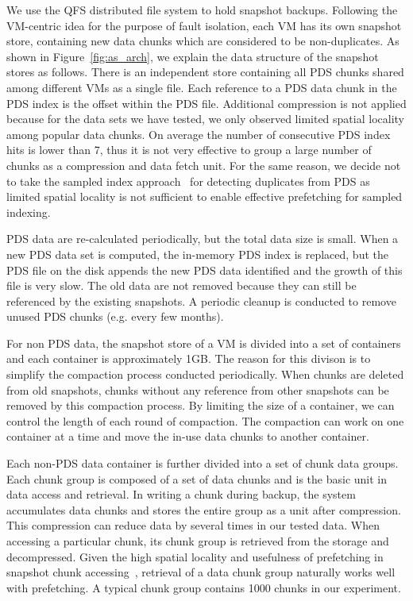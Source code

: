 We use the QFS distributed file system to hold snapshot backups.
Following the VM-centric idea for the purpose of fault isolation,
each VM has its own snapshot store, containing new data chunks which are considered
to be non-duplicates.
As shown in Figure~\ref{fig:as_arch}, we explain the data structure of the snapshot stores as follows.
There is an independent store containing all PDS chunks shared among different VMs as
a single file.
Each reference to a PDS data chunk in the PDS index is the offset within the PDS file.
Additional compression is not applied because 
for the data sets we have tested, we only observed limited spatial locality 
among popular data chunks. On average the number of consecutive PDS index hits is lower than 7,
thus it is not very effective to group a large number of chunks as a compression and data fetch unit. 
For the same reason, we decide not to take the sampled index approach~\cite{Guo2011} 
for detecting duplicates from PDS as limited spatial locality is not sufficient to enable
effective prefetching for sampled indexing.

PDS data are re-calculated periodically, but 
the total data size is small.  When
a new PDS data  set is computed, the in-memory PDS index is replaced, but 
the PDS file on the disk appends the  new PDS data identified and the growth of this file is very slow. 
The old data are not removed because they can still be referenced by the existing snapshots. 
A periodic cleanup is conducted  to remove unused PDS chunks (e.g. every few months). 


For non PDS data, the snapshot store of a VM is  divided into a set of containers and 
each container is approximately 1GB.  The reason for this  divison is to simplify the compaction process
conducted periodically. When  chunks are deleted from old snapshots,
chunks without any reference from other snapshots can be removed by this compaction process.
By limiting the size of a container, we can control the length of each round of compaction.
The compaction  can work on one container at a time and move the in-use data chunks to another container. 

Each non-PDS data container is further divided into a set of chunk data groups. Each chunk group is composed of
a set of data chunks and is the basic unit in data access and retrieval. 
In writing a chunk during backup, the system accumulates data chunks and stores the entire
group as a unit after compression. This  compression can reduce data by several times  in our tested data.
When accessing a particular chunk, its chunk group is retrieved from the storage
and decompressed. Given the high spatial locality and usefulness of prefetching  in 
snapshot chunk accessing~\cite{Guo2011,foundation08},
retrieval of  a data chunk  group naturally works well with prefetching. 
A  typical chunk group contains 1000 chunks in our experiment.


